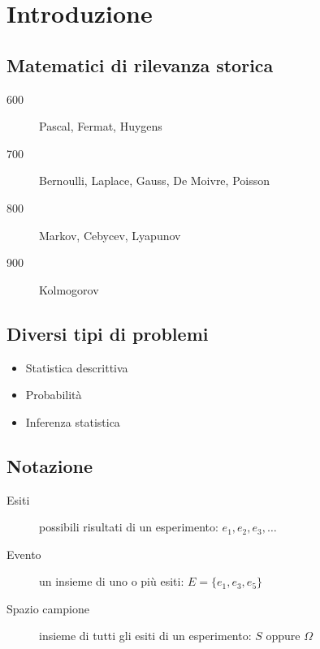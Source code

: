 \documentclass{subfiles}
\begin{document}
\section{Introduzione}

\subsection{Matematici di rilevanza storica}

\begin{description}
	\item[600] Pascal, Fermat, Huygens
	\item[700] Bernoulli, Laplace, Gauss, De Moivre, Poisson
	\item[800] Markov, Cebycev, Lyapunov
	\item[900] Kolmogorov
\end{description}

\subsection{Diversi tipi di problemi}

\begin{itemize}
    \item Statistica descrittiva
    \item Probabilità
    \item Inferenza statistica
\end{itemize}

\subsection{Notazione}

\begin{description}
	\item[Esiti] possibili risultati di un esperimento: $e_1, e_2, e_3, \dots$
	\item[Evento] un insieme di uno o più esiti: $E = \{ e_1, e_3, e_5 \}$
	\item[Spazio campione] insieme di tutti gli esiti di un esperimento: $S \text{ oppure } \Omega$
\end{description}
\end{document}
